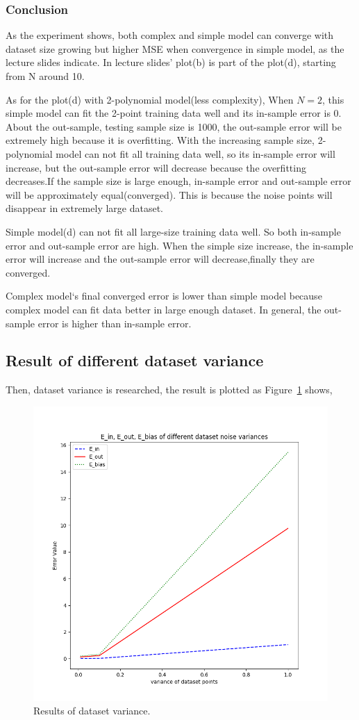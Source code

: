 \documentclass[12pt,letterpaper]{article}
\begin{document}
\subsubsection*{Conclusion}
As the experiment shows, both complex and simple model can converge with dataset size growing but higher MSE when convergence in simple model, as the lecture slides indicate. In lecture slides' plot(b) is part of the plot(d), starting from N around 10.

As for the plot(d) with 2-polynomial model(less complexity), When $N=2$, this simple model can fit the 2-point training data well and its in-sample error is 0. About the out-sample, testing sample size is 1000, the out-sample error will be extremely high because it is overfitting. With the increasing sample size, 2-polynomial model can not fit all training data well, so its in-sample error will increase, but the out-sample error will decrease because the overfitting decreases.If the sample size is large enough, in-sample error and out-sample error will be approximately equal(converged). This is because the noise points will disappear in extremely large dataset. 

Simple model(d) can not fit all large-size training data well. So both in-sample error and out-sample error are high. When the simple size increase, the in-sample error will increase and the out-sample error will decrease,finally they are converged.

Complex model‘s final converged error is lower than simple model because complex model can fit data better in large enough dataset. In general, the out-sample error is higher than in-sample error.

\subsection{Result of different dataset variance}

Then, dataset variance is researched, the result is plotted as Figure~\ref{fig:variance_nonreg} shows,
\begin{figure}[h]
\centering
\includegraphics[width=.4\linewidth]{test_sigma_noreg.png}
\caption{\small Results of dataset variance.}
\label{fig:variance_nonreg}
\end{figure}
\end{document}
